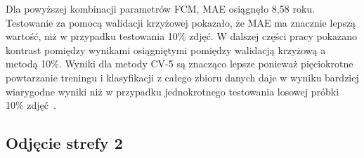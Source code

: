 \documentclass[a4paper,twoside,12pt]{book}
\begin{document}
    Dla powyższej kombinacji parametrów FCM, MAE osiągnęło 8,58 roku.
    Testowanie za pomocą walidacji krzyżowej pokazało, że MAE ma znacznie lepszą wartość, niż w przypadku testowania
    10\% zdjęć. W dalszej części pracy pokazano kontrast pomiędzy wynikami osiągniętymi pomiędzy walidacją krzyżową a
    metodą 10\%. Wyniki dla metody CV-5 są znacząco lepsze ponieważ pięciokrotne powtarzanie treningu i klasyfikacji
    z całego zbioru danych daje w wyniku bardziej wiarygodne wyniki niż w przypadku jednokrotnego testowania losowej
    próbki 10\% zdjęć~\cite{dataMiningAlgorithms}.

    \subsection{Odjęcie strefy 2}\label{subsec:odjęcie-strefy-2}
\end{document}
